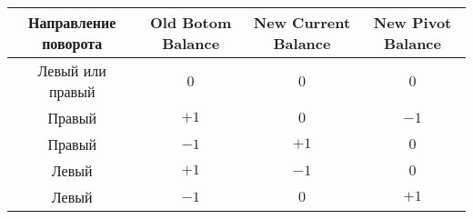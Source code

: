 \begin{table*}[ht]
    \centering

    \begin{tabular}{|c|c|c|c|}
        \hline
        Направление поворота & Old Botom Balance & New Current Balance & New Pivot Balance \\
        \hline
            Левый или правый &        $0$        &         $0$         &        $0$        \\
        \hline
                      Правый &        $+1$       &         $0$         &        $-1$       \\
        \hline
                      Правый &        $-1$       &         $+1$        &        $0$       \\
        \hline
                       Левый &        $+1$       &         $-1$        &        $0$       \\
        \hline
                       Левый &        $-1$       &         $0$         &        $+1$       \\
        \hline
    \end{tabular}

\end{table*}